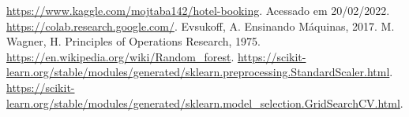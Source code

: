 \documentclass{homework}
\begin{document}
\begin{thebibliography}{1}
     \url{https://www.kaggle.com/mojtaba142/hotel-booking}. Acessado em 20/02/2022.
     \url{https://colab.research.google.com/}.
     Evsukoff, A. Ensinando Máquinas, 2017.
     M. Wagner, H. Principles of Operations Research, 1975.
     \url{https://en.wikipedia.org/wiki/Random_forest}.
     \url{https://scikit-learn.org/stable/modules/generated/sklearn.preprocessing.StandardScaler.html}.
     \url{https://scikit-learn.org/stable/modules/generated/sklearn.model_selection.GridSearchCV.html}.
\end{thebibliography}
\end{document}
